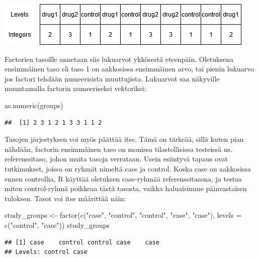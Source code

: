 \documentclass[
]{book}
\newenvironment{Shaded}{\begin{snugshade}}{\end{snugshade}}
\newcommand{\AttributeTok}[1]{\textcolor[rgb]{0.77,0.63,0.00}{#1}}
\newcommand{\FunctionTok}[1]{\textcolor[rgb]{0.00,0.00,0.00}{#1}}
\newcommand{\NormalTok}[1]{#1}
\newcommand{\OtherTok}[1]{\textcolor[rgb]{0.56,0.35,0.01}{#1}}
\newcommand{\StringTok}[1]{\textcolor[rgb]{0.31,0.60,0.02}{#1}}
\begin{document}
\includegraphics{files/05-statistics/factor.png}

Factorien tasoille annetaan siis lukuarvot ykkösestä eteenpäin. Oletuksena ensimmäinen taso eli taso 1 on aakkosissa ensimmäinen arvo, tai pienin lukuarvo jos factori tehdään numeerisista muuttujista. Lukuarvot saa näkyville muuntamalla factorin numeeriseksi vektoriksi:

\begin{Shaded}
\begin{Highlighting}[]
\FunctionTok{as.numeric}\NormalTok{(groups)}
\end{Highlighting}
\end{Shaded}

\begin{verbatim}
##  [1] 2 3 1 2 1 3 3 1 1 2
\end{verbatim}

Tasojen järjestyksen voi myös päättää itse. Tämä on tärkeää, sillä kuten pian nähdään, factorin ensimmäinen taso on monissa tilastollisissa testeissä ns. referenssitaso, johon muita tasoja verrataan. Usein esiintyvä tapaus ovat tutkimukset, joissa on ryhmät nimeltä case ja control. Koska case on aakkosissa ennen controllia, R käyttää oletuksen case-ryhmää referenssitasona, ja testaa miten control-ryhmä poikkeaa tästä tasosta, vaikka haluaisimme päinvastaisen tuloksen. Tasot voi itse määrittää näin:

\begin{Shaded}
\begin{Highlighting}[]
\NormalTok{study\_groups }\OtherTok{\textless{}{-}} \FunctionTok{factor}\NormalTok{(}\FunctionTok{c}\NormalTok{(}\StringTok{"case"}\NormalTok{, }\StringTok{"control"}\NormalTok{, }\StringTok{"control"}\NormalTok{, }\StringTok{"case"}\NormalTok{, }\StringTok{"case"}\NormalTok{),}
                       \AttributeTok{levels =} \FunctionTok{c}\NormalTok{(}\StringTok{"control"}\NormalTok{, }\StringTok{"case"}\NormalTok{))}
\NormalTok{study\_groups}
\end{Highlighting}
\end{Shaded}

\begin{verbatim}
## [1] case    control control case    case   
## Levels: control case
\end{verbatim}
\end{document}
